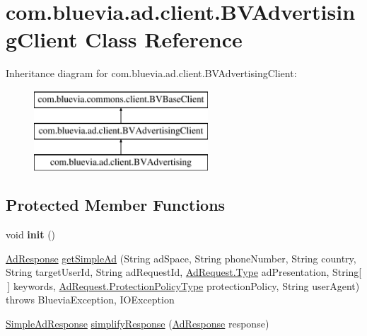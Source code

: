 \hypertarget{classcom_1_1bluevia_1_1ad_1_1client_1_1BVAdvertisingClient}{
\section{com.bluevia.ad.client.BVAdvertisingClient Class Reference}
\label{classcom_1_1bluevia_1_1ad_1_1client_1_1BVAdvertisingClient}
}
Inheritance diagram for com.bluevia.ad.client.BVAdvertisingClient:\begin{figure}[H]
\begin{center}
\leavevmode
\includegraphics[height=3.000000cm]{classcom_1_1bluevia_1_1ad_1_1client_1_1BVAdvertisingClient}
\end{center}
\end{figure}
\subsection*{Protected Member Functions}
\begin{DoxyCompactItemize}
\item 
\hypertarget{classcom_1_1bluevia_1_1ad_1_1client_1_1BVAdvertisingClient_a58e1ba1d7427ac1e2b6b7366ee8b45de}{
void {\bfseries init} ()}
\label{classcom_1_1bluevia_1_1ad_1_1client_1_1BVAdvertisingClient_a58e1ba1d7427ac1e2b6b7366ee8b45de}

\item 
\hyperlink{classcom_1_1bluevia_1_1ad_1_1data_1_1AdResponse}{AdResponse} \hyperlink{classcom_1_1bluevia_1_1ad_1_1client_1_1BVAdvertisingClient_a1f8fa5041487fbfc2c700b3125263f00}{getSimpleAd} (String adSpace, String phoneNumber, String country, String targetUserId, String adRequestId, \hyperlink{classcom_1_1bluevia_1_1ad_1_1data_1_1AdRequest_a09c6520d8fe767e50b3629a4a3583ef3}{AdRequest.Type} adPresentation, String\mbox{[}$\,$\mbox{]} keywords, \hyperlink{classcom_1_1bluevia_1_1ad_1_1data_1_1AdRequest_abd707475c19957f294689451d338c099}{AdRequest.ProtectionPolicyType} protectionPolicy, String userAgent)  throws BlueviaException, IOException 
\item 
\hyperlink{classcom_1_1bluevia_1_1ad_1_1data_1_1simple_1_1SimpleAdResponse}{SimpleAdResponse} \hyperlink{classcom_1_1bluevia_1_1ad_1_1client_1_1BVAdvertisingClient_ae8aad0c316a0f71953e5ed19bde64888}{simplifyResponse} (\hyperlink{classcom_1_1bluevia_1_1ad_1_1data_1_1AdResponse}{AdResponse} response)
\end{DoxyCompactItemize}
